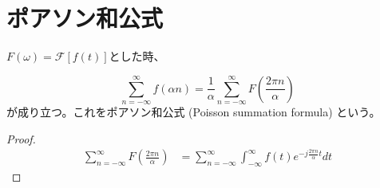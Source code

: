 \documentclass[]{jlreq}
\theoremstyle{definition}
\begin{document}
\section{ポアソン和公式}

$F(\omega) = \mathcal{F}[f(t)]$とした時、

\begin{equation}
  \sum_{n=-\infty}^{\infty} f(\alpha n) = \frac{1}{\alpha} \sum_{n=-\infty}^{\infty} F\left( \frac{2 \pi n}{\alpha}\right)
\end{equation}
%
が成り立つ。これをポアソン和公式 (Poisson summation formula) という。
%
\begin{proof}
  \begin{align}
    \sum_{n=-\infty}^{\infty} F\left( \frac{2 \pi n}{\alpha}\right) 
      &= \sum_{n=-\infty}^{\infty} \int_{-\infty}^{\infty} f(t) e^{-j \frac{2\pi n}{\alpha} t} dt
  \end{align}
\end{proof}
%
\end{document}
